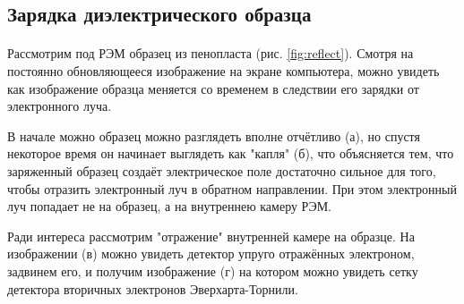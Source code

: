 \documentclass[a4paper,12pt]{article} %
\begin{document}
\subsection{Зарядка диэлектрического образца}

\paragraph{} Рассмотрим под РЭМ образец из пенопласта (рис. \ref{fig:reflect}). Смотря на постоянно обновляющееся изображение на экране компьютера, можно увидеть как изображение образца меняется со временем в следствии его зарядки от электронного луча. 

В начале можно образец можно разглядеть вполне отчётливо (а), но спустя некоторое время он начинает выглядеть как "капля" (б), что объясняется тем, что заряженный образец создаёт электрическое поле достаточно сильное для того, чтобы отразить электронный луч в обратном направлении. При этом электронный луч попадает не на образец, а на внутреннею камеру РЭМ.

Ради интереса рассмотрим "отражение" внутренней камере на образце. На изображении (в) можно увидеть детектор упруго отражённых электроном, задвинем его, и получим изображение (г) на котором можно увидеть сетку детектора вторичных электронов Эверхарта-Торнили.
\end{document}
